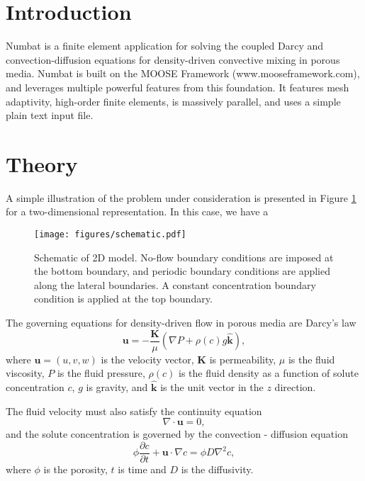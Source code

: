 \documentclass[11pt, a4paper]{csiroreport2012}
\begin{document}
\section{Introduction}

Numbat is a finite element application for solving the coupled Darcy and convection-diffusion equations for density-driven convective mixing in porous media. Numbat is built on the MOOSE Framework (www.mooseframework.com), and leverages multiple powerful features from this foundation. It features mesh adaptivity, high-order finite elements, is massively parallel, and uses a simple plain text input file.

\section{Theory}

A simple illustration of the problem under consideration is presented in Figure \ref{fig:schematic} for a two-dimensional representation. In this case, we have a
\begin{figure}[ht]
\begin{center}
\texttt{[image: figures/schematic.pdf]}
\caption{Schematic of 2D model. No-flow boundary conditions are imposed at the bottom boundary, and periodic boundary conditions are applied along the lateral boundaries. A constant concentration boundary condition is applied at the top boundary.}
\label{fig:schematic}
\end{center}
\end{figure}

The governing equations for density-driven flow in porous media are Darcy's law
\begin{equation}
\mathbf{u} = - \frac{\mathbf{K}}{\mu} \left(\nabla P + \rho(c) g \hat{\mathbf{k}} \right),
\label{eq:darcy}
\end{equation}
where $\mathbf{u} = (u, v, w)$ is the velocity vector, $\mathbf{K}$ is permeability, $\mu$ is the fluid viscosity, $P$ is the fluid pressure, $\rho(c)$ is the fluid density as a function of solute concentration $c$, $g$ is gravity, and $\hat{\mathbf{k}}$ is the unit vector in the $z$ direction.

The fluid velocity must also satisfy the continuity equation
\begin{equation}
\nabla \cdot \mathbf{u} = 0,
\end{equation}
and the solute concentration is governed by the convection - diffusion equation
\begin{equation}
\phi \frac{\partial c}{\partial t} + \mathbf{u} \cdot \nabla c = \phi D \nabla^2 c,
\label{eq:convdiff}
\end{equation}
where $\phi$ is the porosity, $t$ is time and $D$ is the diffusivity.
\end{document}
